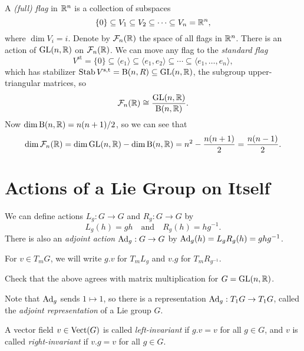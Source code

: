 \begin{example}
  A \emph{(full) flag} in $\mathbb{R}^n$ is
  a collection of subspaces
  \[
    \{0\} \subseteq V_1 \subseteq V_2 \subseteq \cdots \subseteq V_n = \mathbb{R}^n,
  \]
  where $\dim V_i = i$. Denote by
  $\mathcal{F}_n(\mathbb{R})$ the space of
  all flags in $\mathbb{R}^n$. There is an
  action of $\operatorname{GL}(n, \mathbb{R})$ on
  $\mathcal{F}_n(\mathbb{R})$.
  We can move any flag to the
  \emph{standard flag}
  \[
    V^{\mathrm{st}}
    = \{0\} \subseteq \langle e_1 \rangle
    \subseteq \langle e_1, e_2 \rangle
    \subseteq \cdots
    \subseteq \langle e_1, \dots, e_n \rangle,
  \]
  which has stabilizer
  $\operatorname{Stab} V^{\mathrm{s, t}} = \operatorname{B}(n, R) \subseteq \operatorname{GL}(n, \mathbb{R})$,
  the subgroup upper-triangular
  matrices, so
  \[
    \mathcal{F}_n(\mathbb{R})
    \cong \frac{\operatorname{GL}(n, \mathbb{R})}{\operatorname{B}(n, \mathbb{R})}.
  \]
  Now $\dim \operatorname{B}(n, \mathbb{R}) = n(n + 1) / 2$, so
  we can see that
  \[
    \dim \mathcal{F}_n(\mathbb{R})
    = \dim \operatorname{GL}(n, \mathbb{R}) - \dim \operatorname{B}(n, \mathbb{R})
    = n^2 - \frac{n(n + 1)}{2}
    = \frac{n(n - 1)}{2}.
  \]
\end{example}

\section{Actions of a Lie Group on Itself}

\begin{remark}
  We can define actions
  $L_g : G \to G$ and
  $R_g : G \to G$ by
  \[
    L_g(h) = gh \quad\text{and}\quad
    R_g(h) = hg^{-1}.
  \]
  There is also an \emph{adjoint action}
  $\operatorname{Ad}_g : G \to G$
  by $\operatorname{Ad}_g(h) = L_g R_g(h) = g h g^{-1}$.

  For $v \in T_m G$, we will
  write $g . v$ for $T_m L_g$
  and $v . g$ for $T_m R_{g^{-1}}$.
\end{remark}

\begin{exercise}
  Check that the above
  agrees with matrix multiplication
  for $G = \operatorname{GL}(n, \mathbb{R})$.
\end{exercise}

\begin{remark}
  Note that $\operatorname{Ad}_g$ sends
  $1 \mapsto 1$, so there is a
  representation
  $\operatorname{Ad}_g : T_1 G \to T_1 G$, called the
  \emph{adjoint representation}
  of a Lie group $G$.
\end{remark}

\begin{definition}
  A vector field $v \in \operatorname{Vect}(G)$ is
  called \emph{left-invariant}
  if $g . v = v$ for all $g \in G$, and
  $v$ is called
  \emph{right-invariant} if
  $v . g = v$ for all $g \in G$.
\end{definition}

